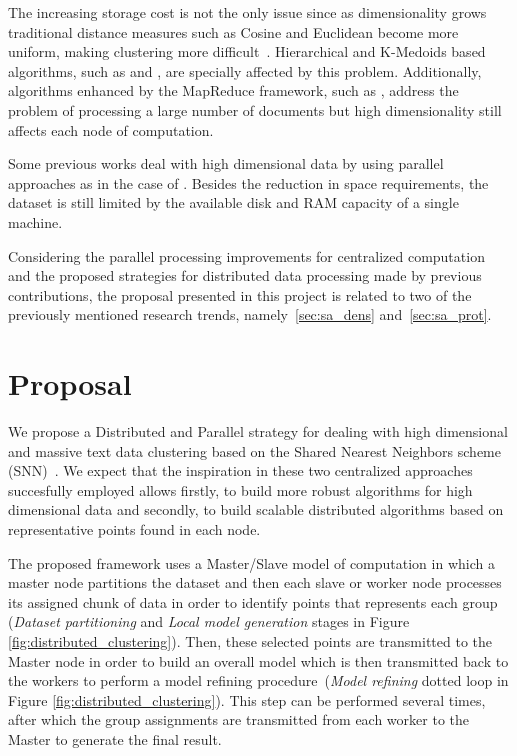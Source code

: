 \documentclass[10pt]{article}
\begin{document}
The increasing storage cost is not the only issue since as dimensionality grows traditional distance measures such as Cosine and Euclidean become more uniform, making clustering more difficult~\citep{ESK03}. Hierarchical and K-Medoids based algorithms, such as \citep{JK00} and \citep{JCHAC15}, are specially affected by this problem. Additionally, algorithms enhanced by the MapReduce framework, such as \citep{EIM11}, address the problem of processing a large number of documents but high dimensionality still affects each node of computation.

Some previous works deal with high dimensional data by using parallel approaches as in the case of \citep{DDGN15}. Besides the reduction in space requirements, the dataset is still limited by the available disk and RAM capacity of a single machine.

Considering the parallel processing improvements for centralized computation and the proposed strategies for distributed data processing made by previous contributions, the proposal presented in this project is related to two of the previously mentioned research trends, namely~\ref{sec:sa_dens} and~\ref{sec:sa_prot}.


\section{Proposal}
We propose a Distributed and Parallel strategy for dealing with high dimensional and massive text data clustering based on the Shared Nearest Neighbors scheme (SNN)~\citep{JP73}\citep{ESK03}. 
We expect that the inspiration in these two centralized approaches succesfully employed allows firstly, to build more robust algorithms for high dimensional data and secondly, to build scalable distributed algorithms based on representative points found in each node.

The proposed framework uses a Master/Slave model of computation in which a master node partitions the dataset and then each slave or worker node processes its assigned chunk of data in order to identify points that represents each group (\textit{Dataset partitioning} and \textit{Local model generation} stages in Figure
\ref{fig:distributed_clustering}). Then, these selected points are transmitted to the Master node in order to build an overall model which is then transmitted back to the workers to perform a model refining procedure~(\textit{Model refining} dotted loop in Figure \ref{fig:distributed_clustering}). This step can be performed several times, after which the group assignments are transmitted from each worker to the Master to generate the final result.
\end{document}
